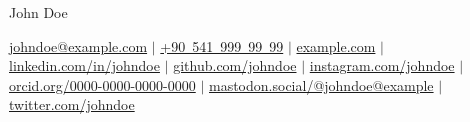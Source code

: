 \documentclass[10pt, letterpaper]{article}
\newenvironment{header}{
    \setlength{\topsep}{0pt}\par\kern\topsep\centering\linespread{1.5}
}{
    \par\kern\topsep
} %
\begin{document}
    \makeatletter
    \newcommand{\test}{%
      \@ifnextchar\par{A}{B}%
    }
    \makeatother

    \begin{header}
        \fontsize{25 pt}{25 pt}\selectfont John Doe

        \vspace{0.3 cm}

        \normalsize
        \mbox{\href{mailto:johndoe@example.com}{johndoe@example.com}}
        \hspace*{0.25 cm}
        $|$
        \hspace*{0.25 cm}
        \mbox{\href{tel:+90-541-999-99-99}{+90 541 999 99 99}}
        \hspace*{0.25 cm}
        $|$
        \hspace*{0.25 cm}
        \mbox{\href{https://example.com/}{example.com}}
        \hspace*{0.25 cm}
        $|$
        \hspace*{0.25 cm}
        \mbox{\href{https://linkedin.com/in/johndoe}{linkedin.com/in/johndoe}}
        \hspace*{0.25 cm}
        $|$
        \hspace*{0.25 cm}
        \mbox{\href{https://github.com/johndoe}{github.com/johndoe}}
        \hspace*{0.25 cm}
        $|$
        \hspace*{0.25 cm}
        \mbox{\href{https://instagram.com/johndoe}{instagram.com/johndoe}}
        \hspace*{0.25 cm}
        $|$
        \hspace*{0.25 cm}
        \mbox{\href{https://orcid.org/0000-0000-0000-0000}{orcid.org/0000-0000-0000-0000}}
        \hspace*{0.25 cm}
        $|$
        \hspace*{0.25 cm}
        \mbox{\href{https://mastodon.social/@johndoe@example}{mastodon.social/@johndoe@example}}
        \hspace*{0.25 cm}
        $|$
        \hspace*{0.25 cm}
        \mbox{\href{https://twitter.com/johndoe}{twitter.com/johndoe}}
        \hspace*{0.25 cm}
        \hspace*{0.25 cm}
    \end{header}

    \vspace{0.3 cm - 0.3 cm}
\end{document}
